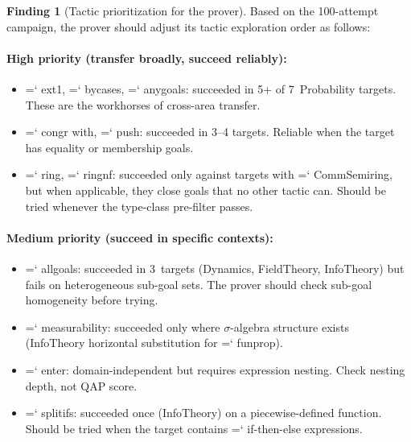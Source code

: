 \documentclass[11pt]{article}
\renewcommand{\texttt}[1]{%
  \begingroup\ttfamily\hyphenchar\font=`\-\relax
  \def\_{\textunderscore\discretionary{}{}{}}%
  #1\endgroup}
\theoremstyle{definition}
\newtheorem{finding}[theorem]{Finding}
\theoremstyle{remark}
\begin{document}
\begin{finding}[Tactic prioritization for the prover]%
\label{find:tactic_priority}
Based on the 100-attempt campaign, the prover should adjust its
tactic exploration order as follows:

\paragraph{High priority (transfer broadly, succeed reliably):}
\begin{itemize}
\item \texttt{ext1}, \texttt{by\_cases}, \texttt{any\_goals}:
  succeeded in 5+ of 7~Probability targets.  These are the
  workhorses of cross-area transfer.
\item \texttt{congr with}, \texttt{push}: succeeded in 3--4
  targets.  Reliable when the target has equality or membership
  goals.
\item \texttt{ring}, \texttt{ring\_nf}: succeeded only against
  targets with \texttt{CommSemiring}, but when applicable, they
  close goals that no other tactic can.  Should be tried whenever
  the type-class pre-filter passes.
\end{itemize}

\paragraph{Medium priority (succeed in specific contexts):}
\begin{itemize}
\item \texttt{all\_goals}: succeeded in 3~targets (Dynamics,
  FieldTheory, InfoTheory) but fails on heterogeneous sub-goal
  sets.  The prover should check sub-goal homogeneity before
  trying.
\item \texttt{measurability}: succeeded only where
  $\sigma$-algebra structure exists (InfoTheory horizontal
  substitution for \texttt{fun\_prop}).
\item \texttt{enter}: domain-independent but requires expression
  nesting.  Check nesting depth, not QAP score.
\item \texttt{split\_ifs}: succeeded once (InfoTheory) on a
  piecewise-defined function.  Should be tried when the target
  contains \texttt{if-then-else} expressions.
\end{itemize}


\end{finding}
\end{document}

